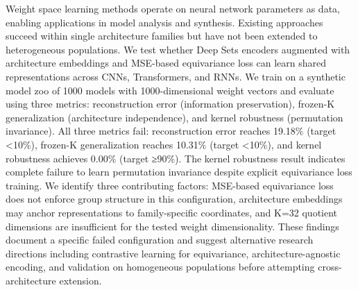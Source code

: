
Weight space learning methods operate on neural network parameters as data, enabling applications in model analysis and synthesis. Existing approaches succeed within single architecture families but have not been extended to heterogeneous populations. We test whether Deep Sets encoders augmented with architecture embeddings and MSE-based equivariance loss can learn shared representations across CNNs, Transformers, and RNNs. We train on a synthetic model zoo of 1000 models with 1000-dimensional weight vectors and evaluate using three metrics: reconstruction error (information preservation), frozen-K generalization (architecture independence), and kernel robustness (permutation invariance). All three metrics fail: reconstruction error reaches 19.18\% (target <10\%), frozen-K generalization reaches 10.31\% (target <10\%), and kernel robustness achieves 0.00\% (target ≥90\%). The kernel robustness result indicates complete failure to learn permutation invariance despite explicit equivariance loss training. We identify three contributing factors: MSE-based equivariance loss does not enforce group structure in this configuration, architecture embeddings may anchor representations to family-specific coordinates, and K=32 quotient dimensions are insufficient for the tested weight dimensionality. These findings document a specific failed configuration and suggest alternative research directions including contrastive learning for equivariance, architecture-agnostic encoding, and validation on homogeneous populations before attempting cross-architecture extension.

